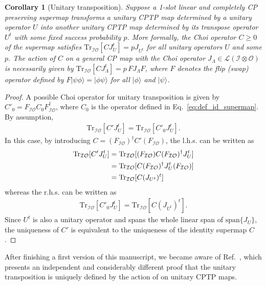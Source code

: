 \documentclass[a4paper,twocolumn,accepted=2022-10-23]{quantumarticle}
\newcommand{\ket}[1]{\vert {#1} \rangle}
\newcommand{\Tr}[0]{{\mathrm{Tr}}}
\newcommand{\ical}[0]{{\mathcal{I}}}
\newcommand{\ocal}[0]{{\mathcal{O}}}
\newtheorem{coll}{Corollary}
\theoremstyle{definition}
\begin{document}
\begin{coll}[Unitary transposition]\label{coll:transpose_unique}
Suppose a 1-slot linear and completely CP preserving supermap transforms a unitary CPTP map determined by a unitary operator $U$ into another unitary CPTP map determined by its transpose operator $U^t$ with some fixed success probability $p$. More formally, the Choi operator $C\geq0$ of the supermap satisfies $\Tr_{\ical \ocal} [ C J_{U}^t ]=p J_{U^t}$ for all unitary operators $U$ and some $p$. The action of $C$ on a general CP map with the Choi operator $J_\Lambda\in\mathcal{L}(\mathcal{I}\otimes\mathcal{O})$ is necessarily given by $\Tr_{\ical \ocal} [ C J_\Lambda^t ] =p \, F  J_\Lambda F$, where $F$ denotes the flip (swap) operator defined by $F \ket{\psi \phi} = \ket{\phi \psi}$ for all $\ket{\phi}$ and $\ket{\psi}$.
\end{coll}
\begin{proof}
A possible Choi operator for unitary transposition is given by $C'_0 = F_{\ical \ocal} C_0 F_{\ical \ocal}^\dag$, where $C_0$ is the operator defined in Eq.~\eqref{eq:def_id_supermap}. By assumption,
\begin{align}
\Tr_{\ical \ocal} [C' J_{U}^t] = \Tr_{\ical \ocal}  [C'_0 J_{U}^t].
\end{align}
In this case, by introducing $C = (F_{\ical \ocal})^\dag C' (F_{\ical \ocal})$,
the l.h.s. can be written as
\begin{align}
\Tr_{\ical \ocal}  [C' J_{U}^t]
&= \Tr_{\ical \ocal} [(F_{\ical \ocal}) C (F_{\ical \ocal})^\dag J_U^t] \notag \\
&= \Tr_{\ical \ocal} [ C (F_{\ical \ocal})^\dag J_U^t (F_{\ical \ocal})] \notag \\
&= \Tr_{\ical \ocal} [ C (J_{U^t})^t]
\end{align}
whereas the r.h.s. can be written as
\begin{align}
\Tr_{\ical \ocal} [C'_0 J_{U}^t] = \Tr_{\ical \ocal} [ C (J_{U^t})^t].
\end{align}
Since $U^t$ is also a unitary operator and spans the whole linear span of $\mathrm{span}\{ J_U \}$,
the uniqueness of $C'$ is equivalent to the uniqueness of the identity supermap $C$.
\end{proof}
After finishing a first version of this manuscript, we became aware of Ref.~\cite{chiribella20}, which presents an independent and considerably different proof that the unitary transposition is uniquely defined by the action of on unitary CPTP maps.
\end{document}
